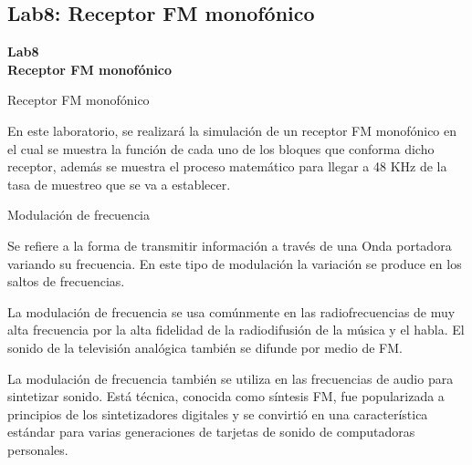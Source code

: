 \subsection{Lab8: Receptor FM monofónico}
\begin{frame}{}


\bfseries{\textrm{\LARGE Lab8\\ \Large Receptor FM monofónico}}
\raggedright
\end{frame}



\begin{frame}{Receptor FM monofónico}



En este laboratorio, se realizará la simulación de un receptor FM monofónico en el cual se muestra la función de cada uno de los bloques que conforma dicho receptor, además se muestra el proceso matemático para llegar a 48 KHz de la tasa de muestreo que se va a establecer.



\end{frame}

\begin{frame}{Modulación de frecuencia}

Se refiere a la forma de transmitir información a través de una Onda portadora variando su frecuencia. En este tipo de modulación la variación se produce en los saltos de frecuencias. \\ \vspace{2mm}

La modulación de frecuencia se usa comúnmente en las radiofrecuencias de muy alta frecuencia por la alta fidelidad de la radiodifusión de la música y el habla. El sonido de la televisión analógica también se difunde por medio de FM. \\ \vspace{2mm}

La modulación de frecuencia también se utiliza en las frecuencias de audio para sintetizar sonido. Está técnica, conocida como síntesis FM, fue popularizada a principios de los sintetizadores digitales y se convirtió en una característica estándar para varias generaciones de tarjetas de sonido de computadoras personales.

\end{frame}


